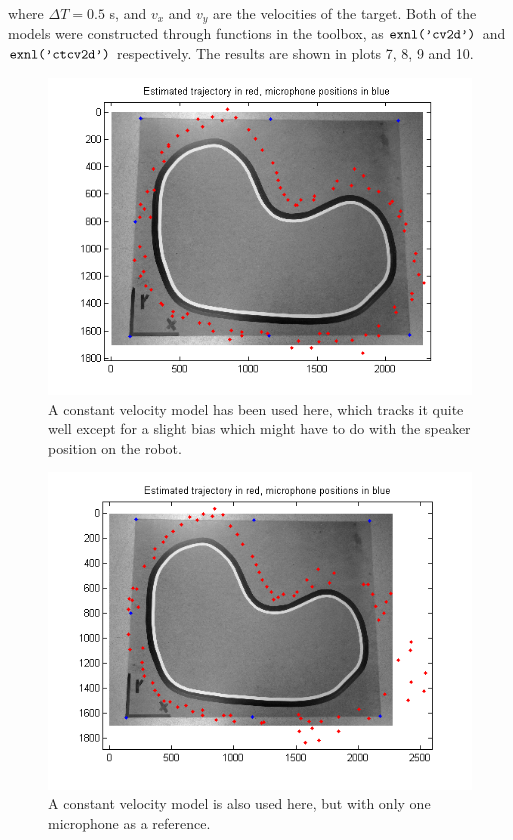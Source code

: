 \documentclass[11pt]{article}
\begin{document}
where $\Delta T = 0.5$ s, and $v_x$ and $v_y$ are the velocities of the target. Both of the models were constructed through functions in the toolbox, as $\verb+exnl('cv2d')+$ and $\verb+exnl('ctcv2d')+$ respectively.
The results are shown in plots 7, 8, 9 and 10.\\
\begin{figure}
\begin{center}
  \includegraphics[width=\textwidth]{ekf_CV_TDOA.png}
  \caption{A constant velocity model has been used here, which tracks it quite well except for a slight bias which might have to do with 
the speaker position on the robot.}
  \end{center}
\end{figure}
\begin{figure}
\begin{center}
  \includegraphics[width=\textwidth]{ekf_CV_TDOA_one_reference.png}
  \caption{A constant velocity model is also used here, but with only one microphone as a reference.}
  \end{center}
\end{figure}
\end{document}
